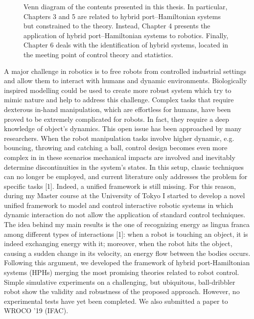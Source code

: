 \begin{figure}
    \centering
    
    \vspace{5mm}
    \caption{Venn diagram of the contents presented in this thesis. In particular, Chapters 3 and 5 are related to hybrid port--Hamiltonian systems but constrained to the theory. Instead, Chapter 4 presents the application of hybrid port--Hamiltonian systems to robotics. Finally, Chapter 6 deals with the identification of hybrid systems, located in the meeting point of control theory and statistics.}
    \label{fig:venn}
\end{figure}

\clearpage
\iffalse
A major challenge in robotics is to free robots from controlled industrial settings and allow them to interact with humans and dynamic environments. Biologically inspired modelling could be used to create more robust system which try to mimic nature and help to address this challenge. Complex tasks that require dexterous in-hand manipulation, which are effortless for humans, have been proved to be extremely complicated for robots. In fact, they require a deep knowledge of object’s dynamics. This open issue has been approached by many researchers. When the robot manipulation tasks involve higher dynamic, e.g. bouncing, throwing and catching a ball, control design becomes even more complex in in these scenarios mechanical impacts are involved and inevitably determine discontinuities in the system’s states. In this setup, classic techniques can no longer be employed, and current literature only addresses the problem for specific tasks [1]. Indeed, a unified framework is still missing. For this reason, during my Master course at the University of Tokyo I started to develop a novel unified framework to model and control interactive robotic systems in which dynamic interaction do not allow the application of standard control techniques. The idea behind my main results is the one of recognizing energy as lingua franca among different types of interactions [1]: when a robot is touching an object, it is indeed exchanging energy with it; moreover, when the robot hits the object, causing a sudden change in its velocity, an energy flow between the bodies occurs. Following this argument, we developed the framework of hybrid port-Hamiltonian systems (HPHs) merging the most promising theories related to robot control. Simple simulative experiments on a challenging, but ubiquitous, ball-dribbler robot show the validity and robustness of the proposed approach. However, no experimental tests have yet been completed. We also submitted a paper to WROCO ’19 (IFAC).
